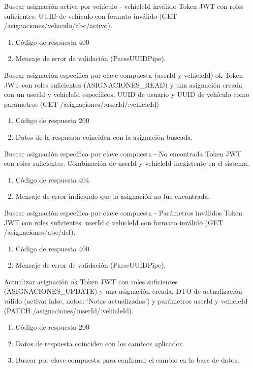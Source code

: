 {Buscar asignación activa por vehículo - vehicleId inválido}
{Token JWT con roles suficientes.}
{UUID de vehículo con formato inválido (GET /asignaciones/vehiculo/abc/activo).}
{\begin{enumerate} [leftmargin=*, nosep]
    \item Código de respuesta 400
    \item Mensaje de error de validación (ParseUUIDPipe).
\end{enumerate}}

{Buscar asignación específica por clave compuesta (userId y vehicleId) ok}
{Token JWT con roles suficientes (ASIGNACIONES\_READ) y una asignación creada con un userId y vehicleId específicos.}
{UUID de usuario y UUID de vehículo como parámetros (GET /asignaciones/:userId/:vehicleId)}
{\begin{enumerate} [leftmargin=*, nosep]
    \item Código de respuesta 200
    \item Datos de la respuesta coinciden con la asignación buscada.
\end{enumerate}}

{Buscar asignación específica por clave compuesta - No encontrada}
{Token JWT con roles suficientes.}
{Combinación de userId y vehicleId inexistente en el sistema.}
{\begin{enumerate} [leftmargin=*, nosep]
    \item Código de respuesta 404
    \item Mensaje de error indicando que la asignación no fue encontrada.
\end{enumerate}}

{Buscar asignación específica por clave compuesta - Parámetros inválidos}
{Token JWT con roles suficientes.}
{userId o vehicleId con formato inválido (GET /asignaciones/abc/def).}
{\begin{enumerate} [leftmargin=*, nosep]
    \item Código de respuesta 400
    \item Mensaje de error de validación (ParseUUIDPipe).
\end{enumerate}}

{Actualizar asignación ok}
{Token JWT con roles suficientes (ASIGNACIONES\_UPDATE) y una asignación creada.}
{DTO de actualización válido (activa: false, notas: 'Notas actualizadas') y parámetros userId y vehicleId (PATCH /asignaciones/:userId/:vehicleId).}
{\begin{enumerate} [leftmargin=*, nosep]
    \item Código de respuesta 200
    \item Datos de respuesta coinciden con los cambios aplicados.
    \item Buscar por clave compuesta para confirmar el cambio en la base de datos.
\end{enumerate}}

